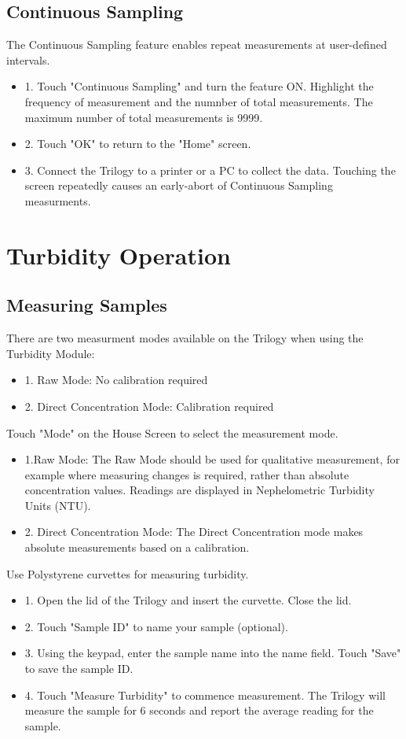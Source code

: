 \documentclass[12pt]{../SOP3_beta}
\begin{document}
\subsection{Continuous Sampling}
\NP The Continuous Sampling feature enables repeat measurements at user-defined intervals.
\begin{itemize}
  \item 1. Touch "Continuous Sampling" and turn the feature ON. Highlight the frequency of measurement and the numnber of total measurements. The maximum number of total measurements is 9999.
  \item 2. Touch "OK" to return to the "Home" screen.
  \item 3. Connect the Trilogy to a printer or a PC to collect the data. Touching the screen repeatedly causes an early-abort of Continuous Sampling measurments. 
\end{itemize}

\section{Turbidity Operation}
\subsection{Measuring Samples}
\NP There are two measurment modes available on the Trilogy when using the Turbidity Module:
\begin{itemize}
  \item 1. Raw Mode: No calibration required
  \item 2. Direct Concentration Mode: Calibration required
\end{itemize}

\NP Touch "Mode" on the House Screen to select the measurement mode.
\begin{itemize}
  \item 1.Raw Mode: The Raw Mode should be used for qualitative measurement, for example where measuring changes is required, rather than absolute concentration values. Readings are displayed in Nephelometric Turbidity Units (NTU).
  \item 2. Direct Concentration Mode: The Direct Concentration mode makes absolute measurements based on a calibration.
\end{itemize}

\NP Use Polystyrene curvettes for measuring turbidity.
\begin{itemize}
  \item 1. Open the lid of the Trilogy and insert the curvette. Close the lid.
  \item 2. Touch "Sample ID" to name your sample (optional).
  \item 3. Using the keypad, enter the sample name into the name field. Touch "Save" to save the sample ID.
  \item 4. Touch "Measure Turbidity" to commence measurement. The Trilogy will measure the sample for 6 seconds and report the average reading for the sample. 
\end{itemize}
\end{document}

